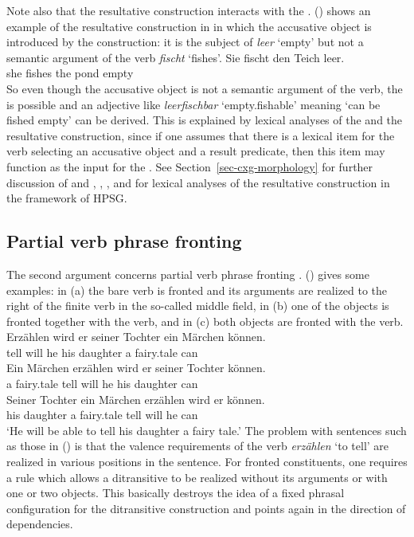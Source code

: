 \documentclass[output=paper,biblatex,babelshorthands,newtxmath,draftmode,colorlinks,citecolor=brown]{langscibook}
\begin{document}
Note also that the resultative construction interacts with the \bard. () shows an example of the resultative
construction in  in which the accusative object is introduced by the construction: it is the subject of
\emph{leer} `empty' but not a semantic argument of the verb \emph{fischt} `fishes'.
\ea
\gll Sie fischt den Teich leer.\\
     she fishes the pond empty\\
\z
So even though the accusative object is not a semantic argument of the verb, the \bard is possible
and an adjective like \emph{leerfischbar} `empty.fishable' meaning `can be fished empty' can be derived. This is explained by lexical analyses of
the \bard and the resultative construction, since if one assumes that there is a lexical item for
the verb  selecting an accusative object and a result predicate, then this item may function as
the input for the \bard. See Section~\ref{sec-cxg-morphology} for further discussion of \bard and
 , , , and  for
 lexical analyses of the resultative construction in the framework of HPSG.%

\subsection{Partial verb phrase fronting}
\label{cxg:sec-partial-verb-phrase-fronting}

The second argument concerns partial verb phrase fronting \citep[Section~5.5.2]{MuellerGT-Eng1}.
() gives some examples: in (a) the bare verb is fronted and its arguments are realized
to the right of the finite verb in the so-called middle field, in (b) one of the objects is fronted together with the verb, and in
(c) both objects are fronted with the verb.
\eal
\ex
\gll Erzählen wird er seiner Tochter ein Märchen können.\\
     tell will he his daughter a fairy.tale can\\
\ex
\gll Ein Märchen erzählen wird er seiner Tochter können.\\
     a fairy.tale tell will he his daughter can\\
\ex
\gll Seiner Tochter ein Märchen erzählen wird er können.\\
     his daughter a fairy.tale tell will he can\\
\glt `He will be able to tell his daughter a fairy tale.'
\zl
The problem with sentences such as those in () is that the valence requirements of the verb
\emph{erzählen} `to tell' are realized in various positions in the sentence. For fronted
constituents, one requires a rule which allows a ditransitive to be realized without its arguments
or with one or two objects. This basically destroys the idea of a fixed phrasal configuration for
the ditransitive construction and points again in the direction of dependencies.
\end{document}
